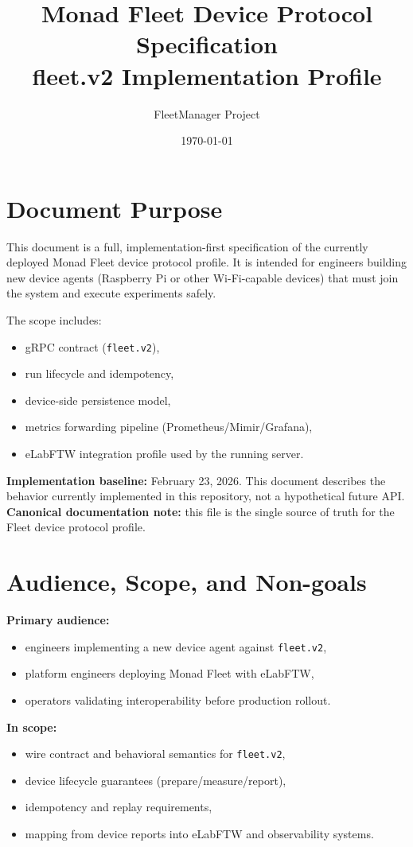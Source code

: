 \documentclass[11pt,a4paper]{article}
\title{Monad Fleet Device Protocol Specification\\fleet.v2 Implementation Profile}
\author{FleetManager Project}
\date{\today}
\begin{document}
\maketitle
\tableofcontents
\newpage

\section{Document Purpose}
This document is a full, implementation-first specification of the currently deployed Monad Fleet device protocol profile.
It is intended for engineers building new device agents (Raspberry Pi or other Wi-Fi-capable devices) that must join the system and execute experiments safely.

The scope includes:
\begin{itemize}
  \item gRPC contract (\texttt{fleet.v2}),
  \item run lifecycle and idempotency,
  \item device-side persistence model,
  \item metrics forwarding pipeline (Prometheus/Mimir/Grafana),
  \item eLabFTW integration profile used by the running server.
\end{itemize}

\textbf{Implementation baseline:} February 23, 2026.
This document describes the behavior currently implemented in this repository, not a hypothetical future API.
\textbf{Canonical documentation note:} this file is the single source of truth for the Fleet device protocol profile.

\section{Audience, Scope, and Non-goals}
\textbf{Primary audience:}
\begin{itemize}
  \item engineers implementing a new device agent against \texttt{fleet.v2},
  \item platform engineers deploying Monad Fleet with eLabFTW,
  \item operators validating interoperability before production rollout.
\end{itemize}

\textbf{In scope:}
\begin{itemize}
  \item wire contract and behavioral semantics for \texttt{fleet.v2},
  \item device lifecycle guarantees (prepare/measure/report),
  \item idempotency and replay requirements,
  \item mapping from device reports into eLabFTW and observability systems.
\end{itemize}
\end{document}
